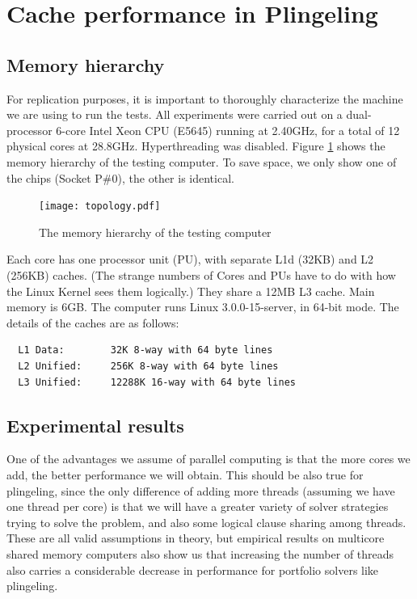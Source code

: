 \documentclass{llncs}
\begin{document}
\section{Cache performance in Plingeling}
\subsection{Memory hierarchy}
\label{sec:memhier}

For replication purposes, it is important to thoroughly characterize
the machine we are using to run the tests. All experiments were
carried out on a dual-processor 6-core Intel Xeon CPU (E5645) running
at 2.40GHz, for a total of 12 physical cores at
28.8GHz. Hyperthreading was disabled. Figure \ref{fig:topology} shows
the memory hierarchy of the testing computer. To save space, we only
show one of the chips (Socket P\#0), the other is identical.

\begin{figure}[htp]
  \centering
  \texttt{[image: topology.pdf]}
  \caption{The memory hierarchy of the testing computer}
  \label{fig:topology}
\end{figure}

Each core has one processor unit (PU), with separate L1d (32KB) and L2
(256KB) caches. (The strange numbers of Cores and PUs have to do with
how the Linux Kernel sees them logically.) They share a 12MB L3
cache. Main memory is 6GB. The computer runs Linux 3.0.0-15-server, in
64-bit mode. The details of the caches are as follows:

\small
\begin{verbatim}
  L1 Data:        32K 8-way with 64 byte lines
  L2 Unified:     256K 8-way with 64 byte lines
  L3 Unified:     12288K 16-way with 64 byte lines
\end{verbatim}
\normalsize

\subsection{Experimental results}

One of the advantages we assume of parallel computing is that the more cores we add, the better performance we will obtain. This should be also true for plingeling, since the only difference of adding more threads (assuming we have one thread per core) is that we will have a greater variety of solver strategies trying to solve the problem, and also some logical clause sharing among threads. These are all valid assumptions in theory, but empirical results on multicore shared memory computers also show us that increasing the number of threads also carries a considerable decrease in performance for portfolio solvers like plingeling. 
\end{document}
